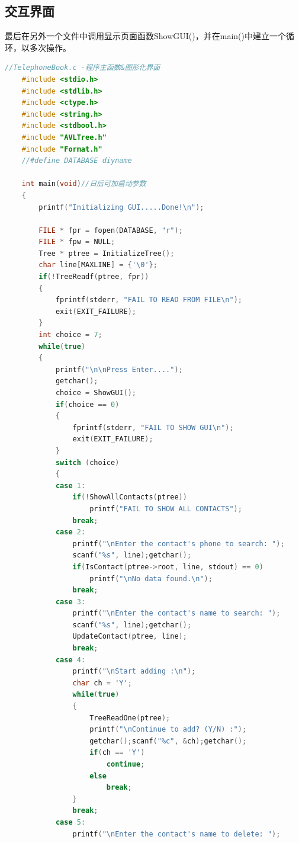 \documentclass[12pt, a4paper, oneside]{ctexart}
\begin{document}
\subsection{交互界面}
最后在另外一个文件中调用显示页面函数ShowGUI()，并在main()中建立一个循环，以多次操作。
\begin{framed}
\begin{lstlisting}[language=C++]
    //TelephoneBook.c -程序主函数&图形化界面
    #include <stdio.h>
    #include <stdlib.h>
    #include <ctype.h>
    #include <string.h>
    #include <stdbool.h>
    #include "AVLTree.h"
    #include "Format.h"
    //#define DATABASE diyname
    
    int main(void)//日后可加启动参数
    {
        printf("Initializing GUI.....Done!\n");
    
        FILE * fpr = fopen(DATABASE, "r");
        FILE * fpw = NULL;
        Tree * ptree = InitializeTree();
        char line[MAXLINE] = {'\0'};
        if(!TreeReadf(ptree, fpr))
        {
            fprintf(stderr, "FAIL TO READ FROM FILE\n");
            exit(EXIT_FAILURE);
        }
        int choice = 7;
        while(true)
        {   
            printf("\n\nPress Enter....");
            getchar();
            choice = ShowGUI();
            if(choice == 0)
            {
                fprintf(stderr, "FAIL TO SHOW GUI\n");
                exit(EXIT_FAILURE);
            }
            switch (choice)
            {
            case 1:
                if(!ShowAllContacts(ptree))
                    printf("FAIL TO SHOW ALL CONTACTS");
                break;
            case 2:
                printf("\nEnter the contact's phone to search: ");
                scanf("%s", line);getchar();
                if(IsContact(ptree->root, line, stdout) == 0)
                    printf("\nNo data found.\n");
                break;
            case 3:
                printf("\nEnter the contact's name to search: ");
                scanf("%s", line);getchar();
                UpdateContact(ptree, line);
                break;
            case 4:
                printf("\nStart adding :\n");
                char ch = 'Y';
                while(true)
                {
                    TreeReadOne(ptree);
                    printf("\nContinue to add? (Y/N) :");
                    getchar();scanf("%c", &ch);getchar();
                    if(ch == 'Y')
                        continue;
                    else
                        break;
                }
                break;
            case 5:
                printf("\nEnter the contact's name to delete: ");

\end{lstlisting}
\end{framed}
\end{document}

